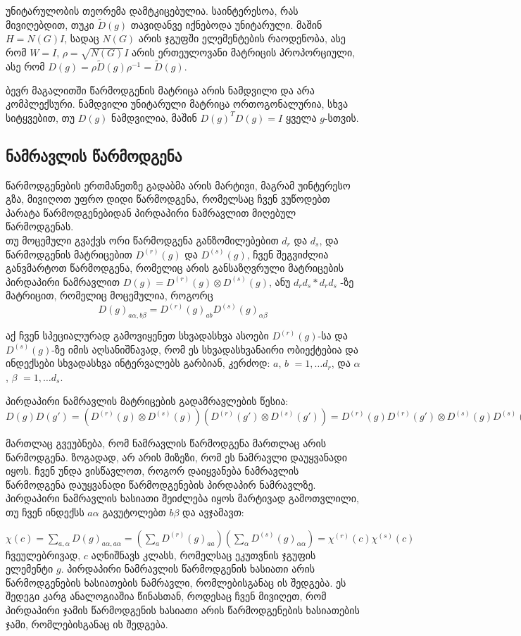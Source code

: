 \documentclass[12pt]{article}
\begin{document}
\begin{sloppypar}
უნიტარულობის თეორემა დამტკიცებულია. საინტერესოა, რას მივიღებდით, თუკი $\widetilde D(g)$ თავიდანვე იქნებოდა უნიტარული. მაშინ $H = N(G)I$, სადაც $N(G)$ არის ჯგუფში ელემენტების რაოდენობა, ასე რომ $W = I$, $\rho = \sqrt{N(G)}I$ არის ერთეულოვანი მატრიცის პროპორციული, ასე რომ $D(g) = \rho \widetilde D(g) \rho^{-1} = \widetilde D(g)$.

ბევრ მაგალითში წარმოდგენის მატრიცა არის ნამდვილი და არა კომპლექსური. ნამდვილი უნიტარული მატრიცა ორთოგონალურია, სხვა სიტყვებით, თუ $D(g)$ ნამდვილია, მაშინ $D(g)^TD(g) = I$ ყველა $g$-სთვის.

\subsection{ნამრავლის წარმოდგენა}
წარმოდგენების ერთმანეთზე გადაბმა არის მარტივი, მაგრამ უინტერესო გზა, მივიღოთ უფრო დიდი წარმოდგენა, რომელსაც ჩვენ ვუწოდებთ პარატა წარმოდგენებიდან პირდაპირი ნამრავლით მიღებულ წარმოდგენას.\\

თუ მოცემული გვაქვს ორი წარმოდგენა განზომილებებით $d_r$ და $d_s$, და წარმოდგენის მატრიცებით $D^{(r)}(g)$ და $D^{(s)}(g)$, ჩვენ შეგვიძლია განვმარტოთ წარმოდგენა, რომელიც არის განსაზღვრული მატრიცების პირდაპირი ნამრავლით $D(g) = D^{(r)}(g) \otimes D^{(s)}(g)$, ანუ $d_{r}d_{s} * d_{r}d_{s}$ -ზე მატრიცით, რომელიც მოცემულია, როგორც
$$D(g)_{a\alpha,b\beta} = D^{(r)}(g)_{ab} D^{(s)}(g)_{\alpha\beta}$$

აქ ჩვენ სპეციალურად გამოვიყენეთ სხვადასხვა ასოები $D^{(r)}(g)$-სა და $D^{(s)}(g)$-ზე იმის აღსანიშნავად, რომ ეს სხვადასხვანაირი ობიექტებია და ინდექსები სხვადასხვა ინტერვალებს გარბიან, კერძოდ: $a$, $b$ $=1,\dots d_r$, და $\alpha$, $\beta$ $=1,\dots d_s$.

პირდაპირი ნამრავლის მატრიცების გადამრავლების წესია: \\
$
 D(g)D(g') = (D^{(r)}(g) \otimes D^{(s)}(g))(D^{(r)}(g') \otimes D^{(s)}(g')) =
 D^{(r)}(g)D^{(r)}(g') \otimes D^{(s)}(g)D^{(s)}(g') = D(gg')
$

მართლაც გვეუბნება, რომ ნამრავლის წარმოდგენა მართლაც არის წარმოდგენა. ზოგადად, არ არის მიზეზი, რომ ეს ნამრავლი დაუყვანადი იყოს. ჩვენ უნდა ვისწავლოთ, როგორ დაიყვანება ნამრავლის წარმოდგენა დაუყვანადი წარმოდგენების პირდაპირ ნამრავლზე.\\

პირდაპირი ნამრავლის ხასიათი შეიძლება იყოს მარტივად გამოთვლილი, თუ ჩვენ ინდექსს $a\alpha$ გავუტოლებთ $b\beta$ და ავჯამავთ:

$
\chi(c) = \sum_{a,\alpha}D(g)_{a\alpha,a\alpha}= (\sum_aD^{(r)}(g)_{aa})(\sum_{\alpha}D^{(s)}(g)_{\alpha\alpha}) = \chi^{(r)}(c)\chi^{(s)}(c)
$
ჩვეულებრივად, $c$ აღნიშნავს კლასს, რომელსაც ეკუთვნის ჯგუფის ელემენტი $g$. პირდაპირი ნამრავლის წარმოდგენის ხასიათი არის წარმოდგენების ხასიათების ნამრავლი, რომლებისგანაც ის შედგება. ეს შედეგი კარგ ანალოგიაშია წინასთან, როდესაც ჩვენ მივიღეთ, რომ პირდაპირი ჯამის წარმოდგენის ხასიათი არის წარმოდგენების ხასიათების ჯამი, რომლებისგანაც ის შედგება.


\end{sloppypar}
\end{document}
